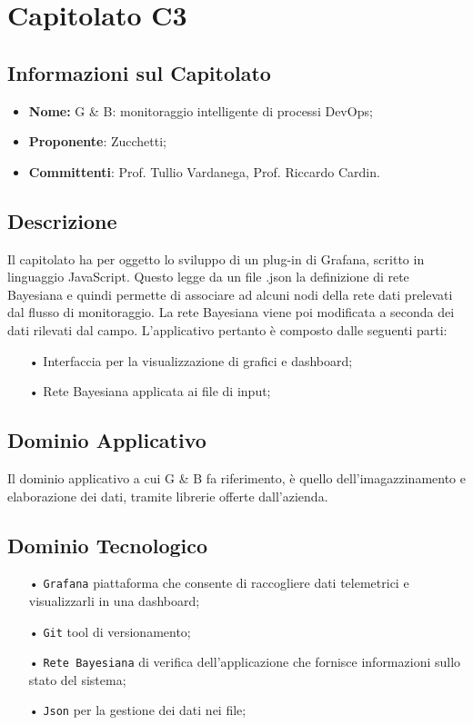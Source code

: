 \section{Capitolato C3}
\subsection{Informazioni sul Capitolato}
\begin{itemize}
	\item \textbf{Nome:}  G \& B: monitoraggio intelligente di processi DevOps;
	\item \textbf{Proponente}: Zucchetti;
	\item \textbf{Committenti}: Prof. Tullio Vardanega, Prof. Riccardo Cardin.
\end{itemize}

\subsection{Descrizione}
Il capitolato ha per oggetto lo sviluppo di un plug-in di Grafana, scritto in linguaggio JavaScript. Questo legge da un file .json la definizione di rete Bayesiana e quindi permette di associare ad alcuni nodi della rete dati prelevati dal flusso di monitoraggio.
La rete Bayesiana viene poi modificata a seconda dei dati rilevati dal campo. 
L'applicativo pertanto è composto dalle seguenti parti: 

\begin{itemize}

\item[•] Interfaccia per la visualizzazione di grafici e dashboard;
\item[•] Rete Bayesiana applicata ai file di input;

\end{itemize}

\subsection{Dominio Applicativo}
Il dominio applicativo a cui G \& B fa riferimento, è quello dell'imagazzinamento e elaborazione dei dati, tramite librerie offerte dall'azienda. 

\subsection{Dominio Tecnologico}
\begin{itemize}

\item[•] \texttt{Grafana} piattaforma che consente di raccogliere dati telemetrici e visualizzarli in una dashboard;
\item[•] \texttt{Git} tool di versionamento;
\item[•] \texttt{Rete Bayesiana} di verifica dell'applicazione che fornisce informazioni sullo stato del sistema;
\item[•] \texttt{Json} per la gestione dei dati nei file;

\end{itemize}

